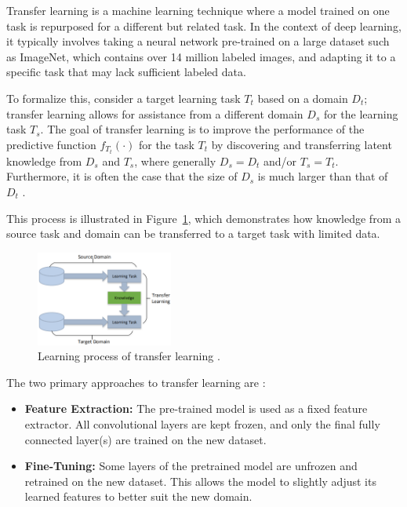 Transfer learning is a machine learning technique where a model trained on one task is repurposed for a different but related task. In the context of deep learning, it typically involves taking a neural network pre-trained on a large dataset such as ImageNet, which contains over 14 million labeled images, and adapting it to a specific task that may lack sufficient labeled data.

To formalize this, consider a target learning task \( T_t \) based on a domain \( D_t \); transfer learning allows for assistance from a different domain \( D_s \) for the learning task \( T_s \). The goal of transfer learning is to improve the performance of the predictive function \( f_{T_t}(\cdot) \) for the task \( T_t \) by discovering and transferring latent knowledge from \( D_s \) and \( T_s \), where generally \( D_s = D_t \) and/or \( T_s = T_t \). Furthermore, it is often the case that the size of \( D_s \) is much larger than that of \( D_t \) \parencite{tan2018survey}.

This process is illustrated in Figure~\ref{fig:figure14}, which demonstrates how knowledge from a source task and domain can be transferred to a target task with limited data.

\begin{figure}[H] %
    \centering
    \includegraphics[width=0.4\textwidth]{chapters/chapter1/images/Figure14.png}
    \caption{Learning process of transfer learning \parencite{tan2018survey}.}
    \label{fig:figure14}
\end{figure}
The two primary approaches to transfer learning are \parencite{tan2018survey}:

\begin{itemize}
    \item \textbf{Feature Extraction:} The pre-trained model is used as a fixed feature extractor. All convolutional layers are kept frozen, and only the final fully connected layer(s) are trained on the new dataset.
    \item \textbf{Fine-Tuning:} Some layers of the pretrained model are unfrozen and retrained on the new dataset. This allows the model to slightly adjust its learned features to better suit the new domain.
\end{itemize}

